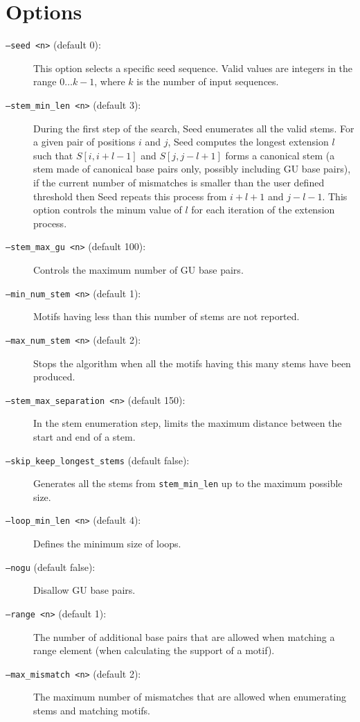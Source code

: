 \documentclass{article}
\begin{document}
\section{Options}

\begin{description}
\item[\texttt{--seed <n>} (default 0):] This option selects a specific
  seed sequence. Valid values are integers in the range $0 \ldots
  k-1$, where $k$ is the number of input sequences.
\item[\texttt{--stem\_min\_len <n>} (default 3):] During the first step
  of the search, Seed enumerates all the valid stems.  For a given
  pair of positions $i$ and $j$, Seed computes the longest
  extension $l$ such that $S[i,i+l-1]$ and $S[j, j-l+1]$ forms a
  canonical stem (a stem made of canonical base pairs only, possibly
  including GU base pairs), if the current number of
  mismatches is smaller than the user defined threshold then Seed
  repeats this process from $i+l+1$ and $j-l-1$.  This option controls
  the minum value of $l$ for each iteration of the extension process.
\item[\texttt{--stem\_max\_gu <n>} (default 100):] Controls the
  maximum number of GU base pairs.
\item[\texttt{--min\_num\_stem <n>} (default 1):] Motifs having less
  than this number of stems are not reported.
\item[\texttt{--max\_num\_stem <n>} (default 2):] Stops the algorithm
  when all the motifs having this many stems have been produced.
\item[\texttt{--stem\_max\_separation <n>} (default 150):]  In the stem
  enumeration step, limits the maximum distance between the start and
  end of a stem.
\item[\texttt{--skip\_keep\_longest\_stems} (default false):]
  Generates all the stems from \texttt{stem\_min\_len} up to the
  maximum possible size.
\item[\texttt{--loop\_min\_len <n>} (default 4):] Defines the minimum
  size of loops.
\item[\texttt{--nogu} (default false):] Disallow GU base pairs.
\item[\texttt{--range <n>} (default 1):] The number of additional base
  pairs that are allowed when matching a range element (when
  calculating the support of a motif).
\item[\texttt{--max\_mismatch <n>} (default 2):] The maximum number of
  mismatches that are allowed when enumerating stems and matching motifs.

\end{description}
\end{document}
